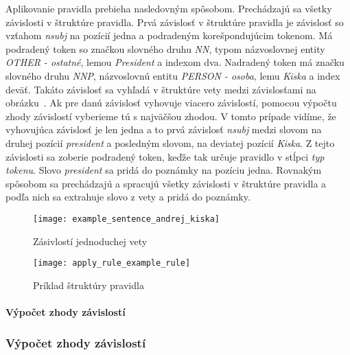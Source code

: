Aplikovanie pravidla prebieha nasledovným spôsobom. Prechádzajú sa všetky závislosti v štruktúre pravidla. Prvá závislosť v štruktúre pravidla je závislosť so vzťahom \textit{nsubj} na pozícií jedna a podradeným korešpondujúcim tokenom. Má podradený token so značkou slovného druhu \textit{NN}, typom názvoslovnej entity \textit{OTHER - ostatné}, lemou \textit{President} a indexom dva. Nadradený token má značku slovného druhu \textit{NNP}, názvoslovnú entitu \textit{PERSON - osoba}, lemu \textit{Kiska} a index deväť. Takáto závislosť sa vyhľadá v štruktúre vety medzi závislosťami na obrázku~. Ak pre danú závislosť vyhovuje viacero závislostí, pomocou výpočtu zhody závislostí vyberieme tú s najväčšou zhodou. V tomto prípade vidíme, že vyhovujúca závislosť je len jedna a to prvá závislosť \textit{nsubj} medzi slovom na druhej pozícií \textit{president} a posledným slovom, na deviatej pozícií \textit{Kiska}. Z tejto závislosti sa zoberie podradený token, keďže tak určuje pravidlo v stĺpci \textit{typ tokenu}. Slovo \textit{president} sa pridá do poznámky na pozíciu jedna. Rovnakým spôsobom sa prechádzajú a spracujú všetky závislosti v štruktúre pravidla a podľa nich sa extrahuje slovo z vety a pridá do poznámky.

\begin{figure}[H]
	\begin{center}\texttt{[image: example\_sentence\_andrej\_kiska]}\end{center}
	\caption[Zásivlostí jednoduchej vety]{Zásivlostí jednoduchej vety}\label{fig:example_sentence_andrej_kiska}
\end{figure}

\begin{figure}[H]
	\begin{center}\texttt{[image: apply\_rule\_example\_rule]}\end{center}
	\caption[Príklad štruktúry pravidla]{Príklad štruktúry pravidla}\label{fig:apply_rule_example_rule}
\end{figure}

%
%
{
	\paragraph{Výpočet zhody závislostí}
}
{
	\subsubsection{Výpočet zhody závislostí}
}
\label{paragraph:dependency_match}

